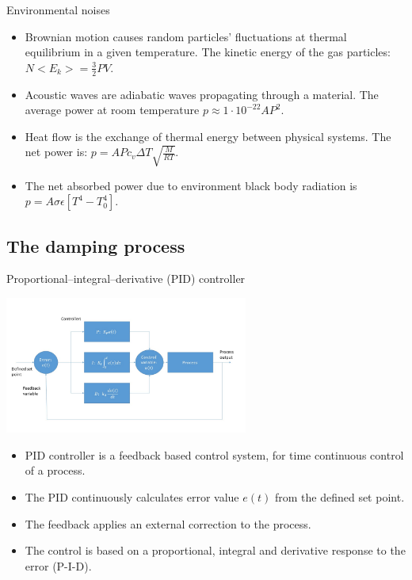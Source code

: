 \documentclass{beamer}
\begin{document}
\begin{frame}{Environmental noises}
	\begin{itemize}
		
		\item Brownian motion causes random particles' fluctuations at thermal equilibrium in a given temperature. The kinetic energy of the gas particles: $ N<E_k> = \frac{3}{2} PV$.
		\item Acoustic waves are adiabatic waves propagating through a material. The average power at room temperature $p  \approx 1\cdot10^{-22}AP^2$.
		\item Heat flow is the exchange of thermal energy between physical systems. The net power is: $p= A P c_v \Delta T \sqrt{\frac{M}{RT}} $.
		\pause
		\item The net absorbed power due to environment black body radiation is $p= A \sigma\epsilon[ T^4- T_0^4]$.
		
	\end{itemize}
\end{frame}

\subsection{The damping process}

\begin{frame}{Proportional–integral–derivative (PID) controller}
	\begin{center}		
		\includegraphics[width=0.6\textwidth,keepaspectratio]{pid_diagram_powerpoint.jpg}
    \end{center}
	\begin{itemize}	
		\item PID controller is a feedback based control system, for time continuous control of a process.
		\item The PID continuously calculates error value $e(t)$ from the defined set point. 
		\pause
		\item The feedback applies an external correction to the process.
		\item The control is based on a proportional, integral and derivative response to the error (P-I-D).
	\end{itemize}
\end{frame}
\end{document}
